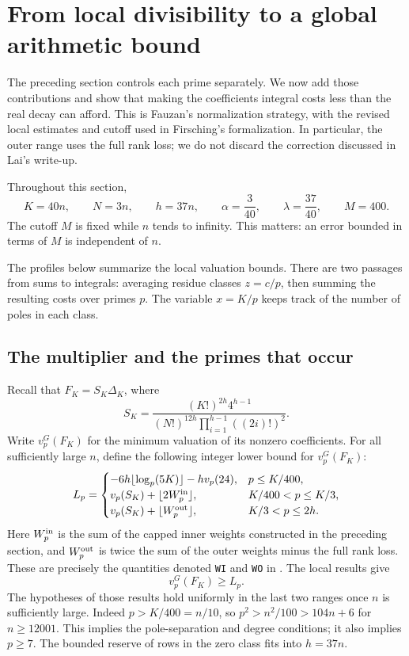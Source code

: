\section{From local divisibility to a global arithmetic bound}
\label{growth:section}

The preceding section controls each prime separately. We now add those
contributions and show that making the coefficients integral costs less
than the real decay can afford. This is Fauzan's normalization strategy,
with the revised local estimates and cutoff used in Firsching's
formalization. In particular, the outer range uses the full rank loss;
we do not discard the correction discussed in Lai's write-up.
\cite[Section 5]{fauzan}
\cite[\texttt{Norm.lean}, \texttt{Growth.lean}]{firsching}

Throughout this section,
\[
 K=40n,\qquad N=3n,\qquad h=37n,\qquad
 \alpha=\frac3{40},\qquad \lambda=\frac{37}{40},\qquad M=400.
\]
The cutoff \(M\) is fixed while \(n\) tends to infinity. This matters:
an error bounded in terms of \(M\) is independent of \(n\).

The profiles below summarize the local valuation bounds. There are two
passages from sums to integrals: averaging residue classes \(z=c/p\),
then summing the resulting costs over primes \(p\). The variable
\(x=K/p\) keeps track of the number of poles in each class.

\subsection{The multiplier and the primes that occur}

Recall that \(F_K=S_K\Delta_K\), where
\[
 S_K=\frac{(K!)^{2h}4^{h-1}}
 {(N!)^{12h}\prod_{i=1}^{h-1}((2i)!)^2}.
\]
Write \(v_p^G(F_K)\) for the minimum valuation of its nonzero
coefficients. For all sufficiently large \(n\), define the following
integer lower bound for \(v_p^G(F_K)\):
\begin{equation}\label{growth:Lp}
 L_p=
 \begin{cases}
 -6h\lfloor\log_p(5K)\rfloor-hv_p(24),&p\le K/400,\\
 v_p(S_K)+\lfloor 2W_p^{\rm in}\rfloor,&K/400<p\le K/3,\\
 v_p(S_K)+\lfloor W_p^{\rm out}\rfloor,&K/3<p\le 2h.
 \end{cases}
\end{equation}
Here \(W_p^{\rm in}\) is the sum of the capped inner weights constructed
in the preceding section, and \(W_p^{\rm out}\) is twice the sum of the
outer weights minus the full rank loss. These are precisely the
quantities denoted \texttt{WI} and \texttt{WO} in
\cite[\texttt{Norm.lean}]{firsching}. The local results give
\[
 v_p^G(F_K)\ge L_p.
\]
The hypotheses of those results hold uniformly in the last two ranges
once \(n\) is sufficiently large. Indeed \(p>K/400=n/10\), so
\(p^2>n^2/100>104n+6\) for \(n\ge12001\). This implies the pole-separation
and degree conditions; it also implies \(p\ge7\). The bounded reserve of
rows in the zero class fits into \(h=37n\).

